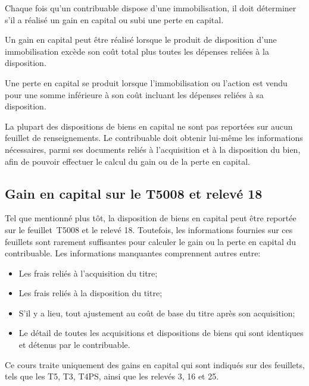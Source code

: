 Chaque fois qu'un contribuable dispose d'une immobilisation, il doit déterminer s'il a réalisé un gain en capital ou subi une perte en capital. 

Un gain en capital peut être réalisé lorsque le produit de disposition d'une immobilisation excède son coût total plus toutes les dépenses reliées à la disposition. 

Une perte en capital se produit lorsque l'immobilisation ou l'action est vendu pour une somme inférieure à son coût incluant les dépenses reliées à sa disposition.

La plupart des dispositions de biens en capital ne sont pas reportées sur aucun feuillet de renseignements. Le contribuable doit obtenir lui-même les informations nécessaires, parmi ses documents reliés à l'acquisition et à la disposition du bien, afin de pouvoir effectuer le calcul du gain ou de la perte en capital. 


\subsection{Gain en capital sur le T5008 et relevé 18}
Tel que mentionné plus tôt, la disposition de biens en capital peut être reportée sur le feuillet~T5008 et le relevé 18. Toutefois, les informations fournies sur ces feuillets sont rarement suffisantes pour calculer le gain ou la perte en capital du contribuable. Les informations manquantes comprennent autres entre:
\begin{itemize}
	\item Les frais reliés à l'acquisition du titre;
	\item Les frais reliés à la disposition du titre;
	\item S'il y a lieu, tout ajustement au coût de base du titre après son acquisition;
	\item Le détail de toutes les acquisitions et dispositions de biens qui sont identiques et détenus par le contribuable.
\end{itemize}

\begin{note}
	Ce cours traite uniquement des gains en capital qui sont indiqués sur des feuillets, tels que les T5, T3, T4PS, ainsi que les relevés 3, 16 et 25.
\end{note}


